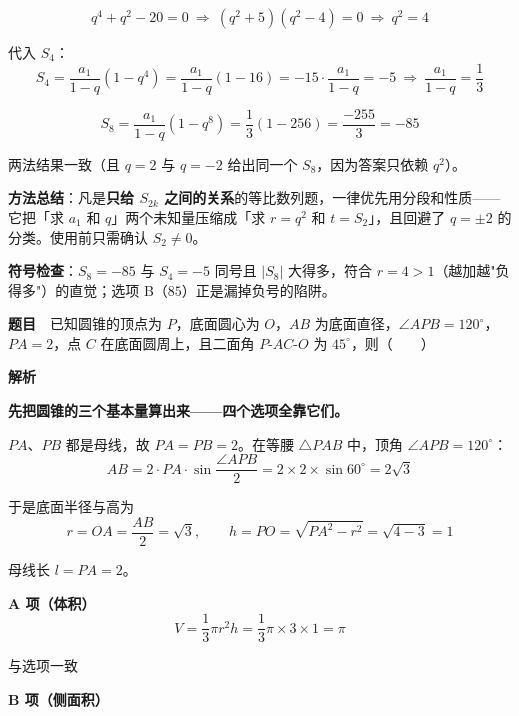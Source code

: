 \[q^{4}+q^{2}-20=0\ \Longrightarrow\ \left(q^{2}+5\right)\left(q^{2}-4\right)=0\ \Longrightarrow\ q^{2}=4\]

代入 $S_4$：
\[S_4=\frac{a_1}{1-q}\left(1-q^{4}\right)=\frac{a_1}{1-q}(1-16)=-15\cdot\frac{a_1}{1-q}=-5\ \Longrightarrow\ \frac{a_1}{1-q}=\frac13\]

\[S_8=\frac{a_1}{1-q}\left(1-q^{8}\right)=\frac13(1-256)=\frac{-255}3=-85\]

两法结果一致（且 $q=2$ 与 $q=-2$ 给出同一个 $S_8$，因为答案只依赖 $q^{2}$）。


\begin{gktip}
\textbf{方法总结}：凡是\textbf{只给 $S_{2k}$ 之间的关系}的等比数列题，一律优先用分段和性质——它把「求 $a_1$ 和 $q$」两个未知量压缩成「求 $r=q^{2}$ 和 $t=S_2$」，且回避了 $q=\pm2$ 的分类。使用前只需确认 $S_2\ne0$。

\textbf{符号检查}：$S_8=-85$ 与 $S_4=-5$ 同号且 $\left|S_8\right|$ 大得多，符合 $r=4>1$（越加越"负得多"）的直觉；选项 B（$85$）正是漏掉负号的陷阱。
\end{gktip}

\par\medskip



\textbf{题目}　已知圆锥的顶点为 $P$，底面圆心为 $O$，$AB$ 为底面直径，$\angle APB=120^\circ$，$PA=2$，点 $C$ 在底面圆周上，且二面角 $P\text{-}AC\text{-}O$ 为 $45^\circ$，则（　　）

\textbf{解析}

\textbf{先把圆锥的三个基本量算出来——四个选项全靠它们。}

$PA$、$PB$ 都是母线，故 $PA=PB=2$。在等腰 $\triangle PAB$ 中，顶角 $\angle APB=120^\circ$：
\[AB=2\cdot PA\cdot\sin\frac{\angle APB}2=2\times2\times\sin60^\circ=2\sqrt3\]

于是底面半径与高为
\[r=OA=\frac{AB}2=\sqrt3,\qquad h=PO=\sqrt{PA^{2}-r^{2}}=\sqrt{4-3}=1\]

母线长 $l=PA=2$。

\par\medskip

\textbf{A 项（体积）}
\[V=\frac13\pi r^{2}h=\frac13\pi\times3\times1=\pi\]

与选项一致 

\par\medskip

\textbf{B 项（侧面积）}

